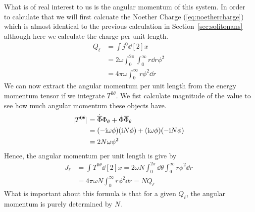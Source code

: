 What is of real interest to us is the angular momentum of this system. In order
to calculate that we will first calcuate the Noether Charge
(\ref{eq:noethercharge}) which is almost identical to the previous calculation
in Section~\ref{sec:solitonans} although here we calculate the charge per unit
length.
\begin{align}
    Q_\ell & = \int j^0\dd[2]{x}                                             \\
           & = 2\omega \int_0^{2\pi}\int_0^\infty r\dd{r}\phi^2              \\
           & = 4\pi\omega \int_0^\infty r\phi^2 \dd{r} \label{eq:spincharge}
\end{align}
We can now extract the angular momentum per unit length from the energy momentum
tensor if we integrate \(T^{0\theta}\). We fist calculate magnitude of the value
to see how much angular momentum these objects have.
\begin{align}
    |T^{0\theta}| & = \dot{\overline{\Phi}}\Phi_\theta + \dot{\Phi}\overline{\Phi}_\theta \\
                  & = (-\mathrm{i}\omega\phi)(\mathrm{i} N\phi) + (\mathrm{i}\omega\phi)(-\mathrm{i} N\phi)           \\
                  & = 2N\omega\phi^2
\end{align}
Hence, the angular momentum per unit length is give by
\begin{align}
    J_\ell & = \int T^{0\theta}\dd[2]{x} = 2\omega N\int_0^{2\pi}\dd{\theta}\int_0^\infty r\phi^2\dd{r} \\
           & = 4\pi\omega N\int_0^\infty r\phi^2\dd{r} = NQ_\ell
\end{align}
What is important about this formula is that for a given \(Q_\ell\), the angular
momentum is purely determined by \(N\).


